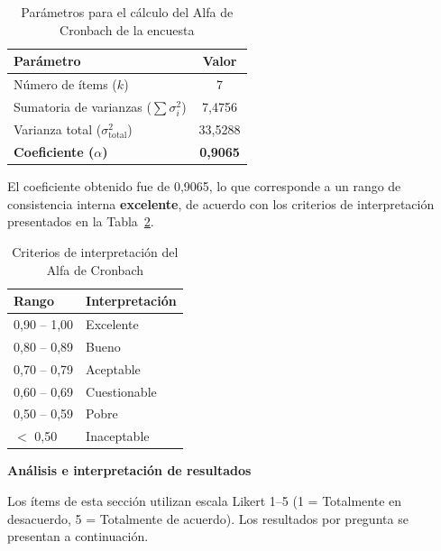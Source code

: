 \begin{table}[H]
    \centering
    \caption{Parámetros para el cálculo del Alfa de Cronbach de la encuesta}
    \label{tab:alfa_cronbach}
    \fontsize{10}{12}\selectfont
    \renewcommand{\arraystretch}{1.2}
    \begin{tabular}{|l|c|}
        \hline
        \textbf{Parámetro} & \textbf{Valor} \\ \hline
        Número de ítems ($k$) & 7 \\ \hline
        Sumatoria de varianzas ($\sum \sigma_i^2$) & 7,4756 \\ \hline
        Varianza total ($\sigma_{\text{total}}^2$) & 33,5288 \\ \hline
        \textbf{Coeficiente ($\alpha$)} & \textbf{0,9065} \\ \hline
    \end{tabular}
\end{table}

El coeficiente obtenido fue de 0,9065, lo que corresponde a un rango de consistencia interna \textbf{excelente}, de acuerdo con los criterios de interpretación presentados en la Tabla~\ref{tab:criterios_cronbach}.

\begin{table}[H]
    \centering
    \caption{Criterios de interpretación del Alfa de Cronbach}
    \label{tab:criterios_cronbach}
    \fontsize{10}{12}\selectfont
    \renewcommand{\arraystretch}{1.2}
    \begin{tabular}{|l|l|}
        \hline
        \textbf{Rango} & \textbf{Interpretación} \\ \hline
        0,90 -- 1,00 & Excelente \\ \hline
        0,80 -- 0,89 & Bueno \\ \hline
        0,70 -- 0,79 & Aceptable \\ \hline
        0,60 -- 0,69 & Cuestionable \\ \hline
        0,50 -- 0,59 & Pobre \\ \hline
        $<$ 0,50 & Inaceptable \\ \hline
    \end{tabular}
\end{table}

\textbf{Análisis e interpretación de resultados}

Los ítems de esta sección utilizan escala Likert 1--5 (1 = Totalmente en desacuerdo, 5 = Totalmente de acuerdo). Los resultados por pregunta se presentan a continuación.

